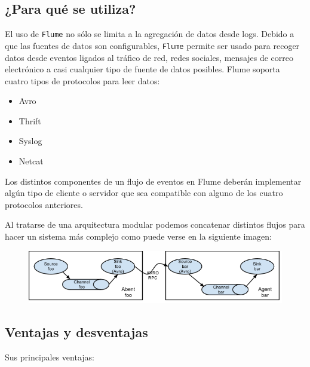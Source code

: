 \documentclass[]{article}
\begin{document}
\subsection{¿Para qué se utiliza?}\label{para-que-se-utiliza}

El uso de \texttt{Flume} no sólo se limita a la agregación de datos
desde logs. Debido a que las fuentes de datos son configurables,
\texttt{Flume} permite ser usado para recoger datos desde eventos
ligados al tráfico de red, redes sociales, mensajes de correo
electrónico a casi cualquier tipo de fuente de datos posibles. Flume
soporta cuatro tipos de protocolos para leer datos:

\begin{itemize}
\itemsep1pt\parskip0pt
\item
  Avro
\item
  Thrift
\item
  Syslog
\item
  Netcat
\end{itemize}

Los distintos componentes de un flujo de eventos en Flume deberán
implementar algún tipo de cliente o servidor que sea compatible con
alguno de los cuatro protocolos anteriores.

Al tratarse de una arquitectura modular podemos concatenar distintos
flujos para hacer un sistema más complejo como puede verse en la
siguiente imagen:

\begin{figure}[H]
\centering
\includegraphics[width=0.8 \textwidth]{img/flume3.png}
\end{figure}

\subsection{Ventajas y desventajas}\label{ventajas-y-desventajas}

Sus principales ventajas:
\end{document}
